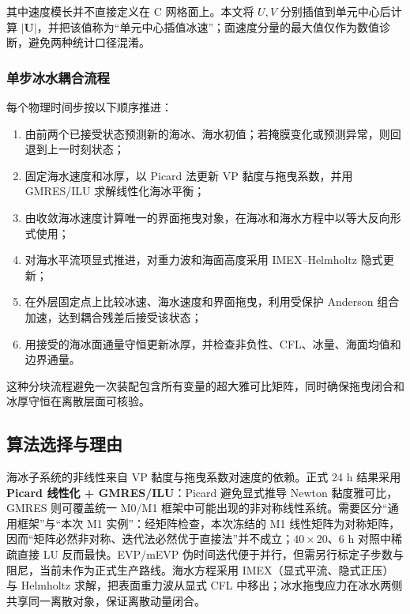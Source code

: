 \documentclass[UTF8]{ctexart}
\newcommand{\vect}[1]{\boldsymbol{#1}}
\begin{document}
其中速度模长并不直接定义在 C 网格面上。本文将 $U,V$ 分别插值到单元中心后计算 $|\vect U|$，并把该值称为“单元中心插值冰速”；面速度分量的最大值仅作为数值诊断，避免两种统计口径混淆。

\subsubsection{单步冰水耦合流程}

每个物理时间步按以下顺序推进：
\begin{enumerate}
\item 由前两个已接受状态预测新的海冰、海水初值；若掩膜变化或预测异常，则回退到上一时刻状态；
\item 固定海水速度和冰厚，以 Picard 法更新 VP 黏度与拖曳系数，并用 GMRES/ILU 求解线性化海冰平衡；
\item 由收敛海冰速度计算唯一的界面拖曳对象，在海冰和海水方程中以等大反向形式使用；
\item 对海水平流项显式推进，对重力波和海面高度采用 IMEX--Helmholtz 隐式更新；
\item 在外层固定点上比较冰速、海水速度和界面拖曳，利用受保护 Anderson 组合加速，达到耦合残差后接受该状态；
\item 用接受的海冰面通量守恒更新冰厚，并检查非负性、CFL、冰量、海面均值和边界通量。
\end{enumerate}
这种分块流程避免一次装配包含所有变量的超大雅可比矩阵，同时确保拖曳闭合和冰厚守恒在离散层面可核验。

\subsection{算法选择与理由}

海冰子系统的非线性来自 VP 黏度与拖曳系数对速度的依赖。正式 24 h 结果采用\textbf{Picard 线性化 + GMRES/ILU}：Picard 避免显式推导 Newton 黏度雅可比，GMRES 则可覆盖统一 M0/M1 框架中可能出现的非对称线性系统\cite{zhang1997,saad2003}。需要区分“通用框架”与“本次 M1 实例”：经矩阵检查，本次冻结的 M1 线性矩阵为对称矩阵，因而“矩阵必然非对称、迭代法必然优于直接法”并不成立；$40\times20$、6 h 对照中稀疏直接 LU 反而最快。EVP/mEVP 伪时间迭代\cite{hunke1997}便于并行，但需另行标定子步数与阻尼，当前未作为正式生产路线。海水方程采用 IMEX（显式平流、隐式正压）与 Helmholtz 求解\cite{ascher1997}，把表面重力波从显式 CFL 中移出；冰水拖曳应力在冰水两侧共享同一离散对象，保证离散动量闭合。
\end{document}
